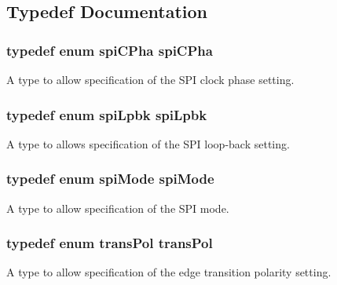 \subsection{Typedef Documentation}
\hypertarget{a00051_aed8a0ae18613612fe7700f5da26144ba}{
\subsubsection[{spi\-C\-Pha}]{\setlength{\rightskip}{0pt plus 5cm}typedef enum {\bf spi\-C\-Pha} {\bf spi\-C\-Pha}}}\label{a00051_aed8a0ae18613612fe7700f5da26144ba}
A type to allow specification of the S\-P\-I clock phase setting. \hypertarget{a00051_a2709984dcd2ad90d6c4066b0d8d0769a}{
\subsubsection[{spi\-Lpbk}]{\setlength{\rightskip}{0pt plus 5cm}typedef enum {\bf spi\-Lpbk} {\bf spi\-Lpbk}}}\label{a00051_a2709984dcd2ad90d6c4066b0d8d0769a}
A type to allows specification of the S\-P\-I loop-\/back setting. \hypertarget{a00051_a6707561b1d595f87f0cf027cdc4f262d}{
\subsubsection[{spi\-Mode}]{\setlength{\rightskip}{0pt plus 5cm}typedef enum {\bf spi\-Mode} {\bf spi\-Mode}}}\label{a00051_a6707561b1d595f87f0cf027cdc4f262d}
A type to allow specification of the S\-P\-I mode. \hypertarget{a00051_a9d877f7feaeca9d2393e8dbae1aca73d}{
\subsubsection[{trans\-Pol}]{\setlength{\rightskip}{0pt plus 5cm}typedef enum {\bf trans\-Pol} {\bf trans\-Pol}}}\label{a00051_a9d877f7feaeca9d2393e8dbae1aca73d}
A type to allow specification of the edge transition polarity setting. 

